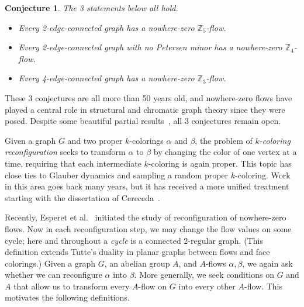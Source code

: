 \documentclass[a4paper,12pt]{article}
\theoremstyle{plain}
\newtheorem{conj}[theorem]{Conjecture}
\theoremstyle{definition}
\newcommand{\Z}{\mathbb{Z}}
\renewcommand\a{\alpha}
\renewcommand\b{\beta}
\begin{document}
\begin{conj} The 3 statements below all hold.
	\begin{itemize}
		\item Every 2-edge-connected graph has a nowhere-zero $\Z_5$-flow.
		\item Every 2-edge-connected graph with no Petersen minor has a nowhere-zero $\Z_4$-flow.
		\item Every 4-edge-connected graph has a nowhere-zero $\Z_3$-flow.
	\end{itemize}
\end{conj}
These $3$ conjectures are all more than 50 years old, and nowhere-zero flows have played a central role in
structural and chromatic graph theory since they were posed. Despite some beautiful partial results~\cite{jaeger,seymour,LTWZ}, all $3$ conjectures remain open.

Given a graph $G$ and two proper $k$-colorings $\a$ and $\b$, the problem of \emph{$k$-coloring reconfiguration}
seeks to transform $\a$ to $\b$ by changing the color of one vertex at a time, requiring that each intermediate $k$-coloring is again proper. 
This topic has close ties to Glauber dynamics and sampling a random proper $k$-coloring.  Work in this area goes back many years, but it has received a more unified
treatment starting with the dissertation of Cereceda~\cite{cereceda-diss}.

Recently, Esperet et al.~\cite{esperet-et-al} initiated the study of reconfiguration of nowhere-zero flows. Now in each reconfiguration step, we may change the flow values on some cycle; here and throughout a \emph{cycle} is a connected 2-regular graph. (This definition extends
Tutte's duality in planar graphs between flows and face colorings.) Given a graph $G$, an abelian group $A$, and $A$-flows $\a,\b$, we again ask whether we can reconfigure $\a$ into $\b$. More generally, we seek conditions on $G$ and $A$ that allow us to transform every $A$-flow on $G$ into every other $A$-flow.  This motivates the following
definitions.
\end{document}
